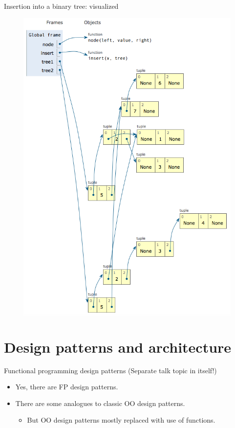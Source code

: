 \begin{frame}{Insertion into a binary tree: visualized}
  \begin{figure}
    \includegraphics[height=0.8\textheight]{trees.png}
  \end{figure}
\end{frame}

\section{Design patterns and architecture}

\begin{frame}{Functional programming design patterns}
  (Separate talk topic in itself!)

  \begin{itemize}
  \item Yes, there are FP design patterns.
  \item There are some analogues to classic OO design patterns.
    \begin{itemize}
    \item But OO design patterns mostly replaced with use of functions.
    \end{itemize}
  \end{itemize}
\end{frame}

